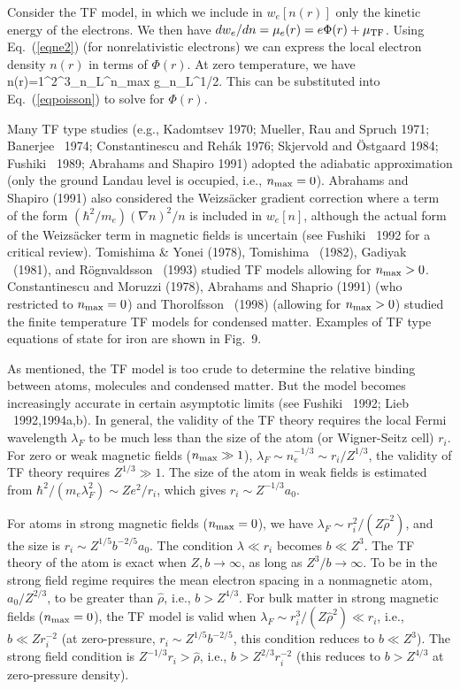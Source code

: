 Consider the TF model, in which we include in $w_e[n(r)]$ only the kinetic
energy of the electrons. We then have $dw_e/dn=\mu_e(r)=e\Phi(r)+\mu_{\rm TF}$.
Using Eq.~(\ref{eqne2}) (for nonrelativistic electrons) we can express
the local electron density $n(r)$ in terms of $\Phi(r)$. At zero temperature,
we have
\be
n(r)={1\over {}\pi^2\hat\rho^3}\sum_{n_L}^{n_{\rm max}}
g_{n_L}\!^{1/2}.
\ee
This can be substituted into Eq.~(\ref{eqpoisson}) to solve for $\Phi(r)$.

Many TF type studies (e.g., Kadomtsev 1970; Mueller, Rau and Spruch 1971; 
Banerjee \etal~1974; Constantinescu and Reh\'ak 1976; Skjervold and
\"Ostgaard 1984; Fushiki \etal~1989; Abrahams and Shapiro 1991)
adopted the adiabatic approximation (only the ground Landau level is 
occupied, i.e., $n_{\rm max}=0$). Abrahams and Shapiro (1991) also considered
the Weizs\"acker gradient correction where a term of the form
$(\hbar^2/m_e)(\nabla n)^2/n$ is included in $w_e[n]$, although
the actual form of the Weizs\"acker term in magnetic fields is uncertain
(see Fushiki \etal~1992 for a critical review).
Tomishima \& Yonei (1978), Tomishima \etal~(1982), Gadiyak \etal~(1981), 
and R\"ognvaldsson \etal~(1993)
studied TF models allowing for $n_{\rm max}>0$. 
Constantinescu and Moruzzi (1978), Abrahams and Shaprio (1991)
(who restricted to $n_{\rm max}=0$) and Thorolfsson \etal~(1998) (allowing
for $n_{\rm max}>0$) studied the finite temperature TF models for condensed 
matter. Examples of TF type equations of state for iron are shown in Fig.~9.

As mentioned, the TF model is too crude to determine the relative binding
between atoms, molecules and condensed matter. But the model becomes
increasingly accurate in certain asymptotic limits (see
Fushiki \etal~1992; Lieb \etal~1992,1994a,b). In general, the validity of
the TF theory requires the local Fermi wavelength $\lambda_F$ to be much 
less than the size of the atom (or Wigner-Seitz cell) $r_i$. 
For zero or weak magnetic fields ($n_{\rm max}\gg 1$), $\lambda_F\sim 
n_e^{-1/3}\sim r_i/Z^{1/3}$, the validity of TF theory requires
$Z^{1/3}\gg 1$. The size of the atom in weak fields is estimated from
$\hbar^2/(m_e\lambda_F^2)\sim Ze^2/r_i$, which gives $r_i\sim Z^{-1/3}a_0$.

For atoms in strong magnetic fields ($n_{\rm max}=0$), we have $\lambda_F
\sim r_i^2/(Z\hat\rho^2)$, and the size is $r_i\sim Z^{1/5}b^{-2/5}a_0$.
The condition $\lambda\ll r_i$ becomes $b\ll Z^3$. The TF theory of the atom is
exact when $Z,b\rightarrow\infty$, as long as $Z^3/b\rightarrow\infty$.
To be in the strong field regime requires the mean electron
spacing in a nonmagnetic atom, $a_0/Z^{2/3}$, to be greater than $\hat\rho$,
i.e., $b>Z^{4/3}$.
For bulk matter in strong magnetic fields ($n_{\rm max}=0$), 
the TF model is valid when $\lambda_F\sim r_i^3/(Z\hat\rho^2)\ll r_i$,
i.e., $b\ll Zr_i^{-2}$ (at zero-pressure, $r_i\sim Z^{1/5}b^{-2/5}$, this
condition reduces to $b\ll Z^3$). The strong field condition is
$Z^{-1/3}r_i>\hat\rho$, i.e., $b>Z^{2/3}r_i^{-2}$ (this reduces to
$b>Z^{4/3}$ at zero-pressure density). 


